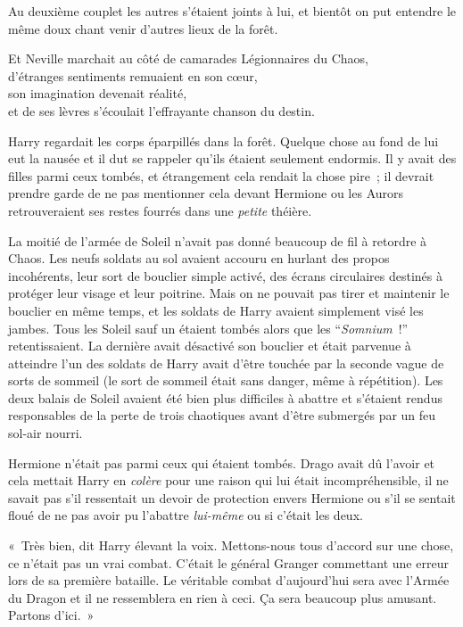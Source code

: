 Au deuxième couplet les autres s'étaient joints à lui, et bientôt on put entendre le même doux chant venir d'autres lieux de la forêt.

Et Neville marchait au côté de camarades Légionnaires du Chaos,\\ d'étranges sentiments remuaient en son cœur,\\ son imagination devenait réalité,\\ et de ses lèvres s'écoulait l'effrayante chanson du destin.

\later

Harry regardait les corps éparpillés dans la forêt.
Quelque chose au fond de lui eut la nausée et il dut se rappeler qu'ils étaient seulement endormis.
Il y avait des filles parmi ceux tombés, et étrangement cela rendait la chose pire~; il devrait prendre garde de ne pas mentionner cela devant Hermione ou les Aurors retrouveraient ses restes fourrés dans une \emph{petite} théière.

La moitié de l'armée de Soleil n'avait pas donné beaucoup de fil à retordre à Chaos.
Les neufs soldats au sol avaient accouru en hurlant des propos incohérents, leur sort de bouclier simple activé, des écrans circulaires destinés à protéger leur visage et leur poitrine.
Mais on ne pouvait pas tirer et maintenir le bouclier en même temps, et les soldats de Harry avaient simplement visé les jambes.
Tous les Soleil sauf un étaient tombés alors que les “\emph{Somnium}~!” retentissaient.
La dernière avait désactivé son bouclier et était parvenue à atteindre l'un des soldats de Harry avait d'être touchée par la seconde vague de sorts de sommeil (le sort de sommeil était sans danger, même à répétition).
Les deux balais de Soleil avaient été bien plus difficiles à abattre et s'étaient rendus responsables de la perte de trois chaotiques avant d'être submergés par un feu sol-air nourri.

Hermione n'était pas parmi ceux qui étaient tombés.
Drago avait dû l'avoir et cela mettait Harry en \emph{colère} pour une raison qui lui était incompréhensible, il ne savait pas s'il ressentait un devoir de protection envers Hermione ou s'il se sentait floué de ne pas avoir pu l'abattre \emph{lui-même} ou si c'était les deux.

«~Très bien, dit Harry élevant la voix.
Mettons-nous tous d'accord sur une chose, ce n'était pas un vrai combat.
C'était le général Granger commettant une erreur lors de sa première bataille.
Le véritable combat d'aujourd'hui sera avec l'Armée du Dragon et il ne ressemblera en rien à ceci.
Ça sera beaucoup plus amusant.
Partons d'ici.~»

